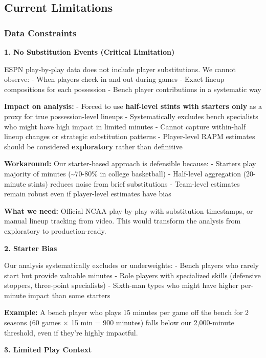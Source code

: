 \documentclass[
  letterpaper,
  DIV=11,
  numbers=noendperiod]{scrartcl}
\begin{document}
\subsection{Current Limitations}\label{current-limitations}

\subsubsection{Data Constraints}\label{data-constraints}

\textbf{1. No Substitution Events (Critical Limitation)}

ESPN play-by-play data does not include player substitutions. We cannot
observe: - When players check in and out during games - Exact lineup
compositions for each possession - Bench player contributions in a
systematic way

\textbf{Impact on analysis:} - Forced to use \textbf{half-level stints
with starters only} as a proxy for true possession-level lineups -
Systematically excludes bench specialists who might have high impact in
limited minutes - Cannot capture within-half lineup changes or strategic
substitution patterns - Player-level RAPM estimates should be considered
\textbf{exploratory} rather than definitive

\textbf{Workaround:} Our starter-based approach is defensible because: -
Starters play majority of minutes (\textasciitilde70-80\% in college
basketball) - Half-level aggregation (20-minute stints) reduces noise
from brief substitutions - Team-level estimates remain robust even if
player-level estimates have bias

\textbf{What we need:} Official NCAA play-by-play with substitution
timestamps, or manual lineup tracking from video. This would transform
the analysis from exploratory to production-ready.

\textbf{2. Starter Bias}

Our analysis systematically excludes or underweights: - Bench players
who rarely start but provide valuable minutes - Role players with
specialized skills (defensive stoppers, three-point specialists) -
Sixth-man types who might have higher per-minute impact than some
starters

\textbf{Example:} A bench player who plays 15 minutes per game off the
bench for 2 seasons (60 games × 15 min = 900 minutes) falls below our
2,000-minute threshold, even if they're highly impactful.

\textbf{3. Limited Play Context}
\end{document}
